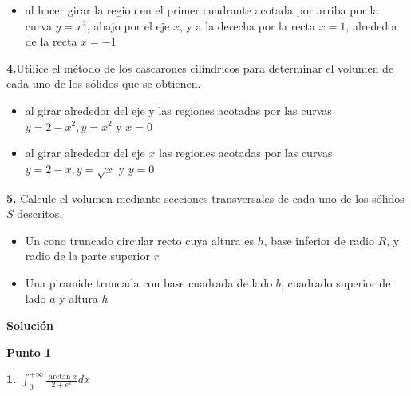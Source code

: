 \documentclass[12pt]{article}
\begin{document}
\begin{flushleft}
\begin{itemize}
    \item al hacer girar la region en el primer cuadrante acotada por arriba por la curva $y=x^{2}$, abajo por el eje $x$, y a la derecha por la recta $x=1$, alrededor de la recta $x=-1$
    
\end{itemize}
\vspace{0.5cm}

\textbf{4.}Utilice el método de los cascarones cilíndricos para determinar el volumen de cada uno de los sólidos que se obtienen.\\




\begin{itemize}
    \item al girar alrededor del eje y las regiones acotadas por las curvas $y=2-x^{2}, y=x^{2}$ y $x=0$

    \item al girar alrededor del eje $x$ las regiones acotadas por las curvas $y=2-x, y=\sqrt{x}$ y $y=0$
    
\end{itemize}
\vspace{0.5cm}


\textbf{5.} Calcule el volumen mediante secciones transversales de cada uno de los sólidos $S$ descritos.



\begin{itemize}
    \item Un cono truncado circular recto cuya altura es $h$, base inferior de radio $R$, y radio de la parte superior $r$

    \item Una piramide truncada con base cuadrada de lado $b$, cuadrado superior de lado $a$ y altura $h$
    
\end{itemize}


\newpage


\begin{center}
    \textbf{Solución}
\end{center}
\vspace{1cm}

\textbf{Punto 1}
\vspace{0.5cm}

\textbf{1.} \large $\int_{0}^{+\infty }\frac{\arctan x}{2+e^{x}}dx$
\vspace{0.5cm}

\normalsize


\end{flushleft}
\end{document}
